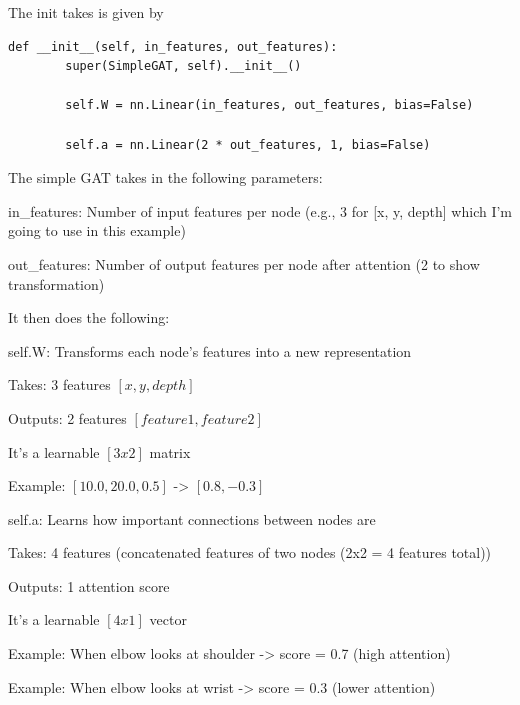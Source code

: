 The init takes is given by 

\begin{lstlisting}[style=pythonstyle,title={GAT toy example},label={code:gat_toy_example}]
def __init__(self, in_features, out_features):
        super(SimpleGAT, self).__init__()
        
        self.W = nn.Linear(in_features, out_features, bias=False)
        
        self.a = nn.Linear(2 * out_features, 1, bias=False)
\end{lstlisting}

The simple GAT takes in the following parameters:

\begin{compactitem}
   \item in\_features: Number of input features per node (e.g., 3 for [x, y, depth] which I'm going to use in this example) 
   \item out\_features: Number of output features per node after attention (2 to show transformation)
\end{compactitem}

It then does the following:

\begin{compactitem}
\item self.W: Transforms each node's features into a new representation
   \begin{compactitem}
      \item Takes: 3 features $[x, y, depth]$
      \item Outputs: 2 features $[feature1, feature2]$
      \item It's a learnable $[3x2]$ matrix
      \item Example: $[10.0, 20.0, 0.5]$ -> $[0.8, -0.3]$
   \end{compactitem}
\item self.a: Learns how important connections between nodes are
   \begin{compactitem}
      \item Takes: 4 features (concatenated features of two nodes (2x2 = 4 features total))
      \item Outputs: 1 attention score
      \item It's a learnable $[4x1]$ vector
      \item Example: When elbow looks at shoulder -> score = 0.7 (high attention)
      \item Example: When elbow looks at wrist -> score = 0.3 (lower attention)
   \end{compactitem}
\end{compactitem}

